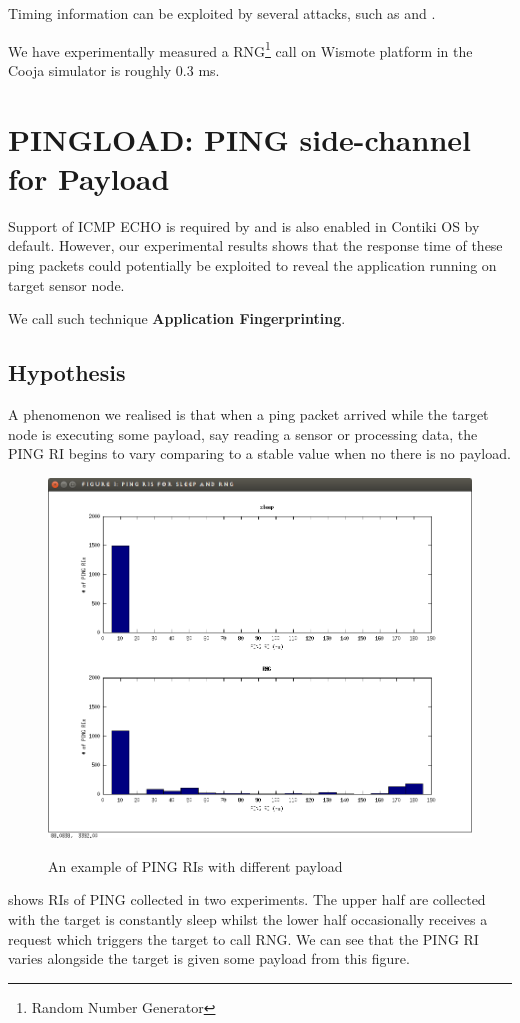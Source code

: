 Timing information can be exploited by several attacks, such as \cite{Peekaboo} and \cite{rsatiming}.

We have experimentally measured a RNG\footnote{Random Number Generator} call on Wismote platform in the Cooja simulator is roughly 0.3 ms.

\section{PINGLOAD: PING side-channel for Payload }
Support of ICMP ECHO is required by \cite{rfc1122} and is also enabled in Contiki OS by default. However, our experimental results shows that the response time of these ping packets could potentially be exploited to reveal the application running on target sensor node.

We call such technique {\bf  Application Fingerprinting}.

\subsection{Hypothesis} \label{Sec: pingload hypothesis}
A phenomenon we realised is that when a ping packet arrived while the target node is executing some payload, say reading a sensor or processing data, the PING RI begins to vary comparing to a stable value  when no there is no payload. 

\begin{example}
\begin{figure}
\centering
{
  \includegraphics[width=1\textwidth]{fig/pingri.png}
}
\caption{An example of PING RIs with different payload}
\label{Fig: PINGLOAD RIs}
\end{figure}
 shows RIs of PING collected in two experiments. The upper half are collected with the target is constantly sleep whilst the lower half occasionally receives a request which triggers the target to call RNG. We can see that the PING RI varies alongside the target is given some payload from this figure.
\end{example}

